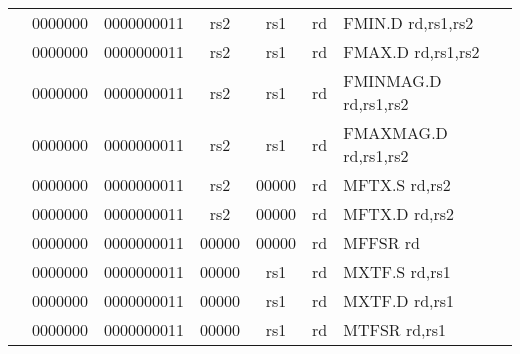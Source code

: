 \begin{table}[p]
\begin{small}
\begin{center}
\begin{tabular}{rcccccccccl}
&
\multicolumn{1}{|c|}{0000000} &
\multicolumn{5}{c|}{0000000011} &
\multicolumn{1}{c|}{rs2} &
\multicolumn{1}{c|}{rs1} &
\multicolumn{1}{c|}{rd} & FMIN.D rd,rs1,rs2 \\
\cline{2-10}
  

&
\multicolumn{1}{|c|}{0000000} &
\multicolumn{5}{c|}{0000000011} &
\multicolumn{1}{c|}{rs2} &
\multicolumn{1}{c|}{rs1} &
\multicolumn{1}{c|}{rd} & FMAX.D rd,rs1,rs2 \\
\cline{2-10}
  

&
\multicolumn{1}{|c|}{0000000} &
\multicolumn{5}{c|}{0000000011} &
\multicolumn{1}{c|}{rs2} &
\multicolumn{1}{c|}{rs1} &
\multicolumn{1}{c|}{rd} & FMINMAG.D rd,rs1,rs2 \\
\cline{2-10}
  

&
\multicolumn{1}{|c|}{0000000} &
\multicolumn{5}{c|}{0000000011} &
\multicolumn{1}{c|}{rs2} &
\multicolumn{1}{c|}{rs1} &
\multicolumn{1}{c|}{rd} & FMAXMAG.D rd,rs1,rs2 \\
\cline{2-10}
  

&
\multicolumn{1}{|c|}{0000000} &
\multicolumn{5}{c|}{0000000011} &
\multicolumn{1}{c|}{rs2} &
\multicolumn{1}{c|}{00000} &
\multicolumn{1}{c|}{rd} & MFTX.S rd,rs2 \\
\cline{2-10}
  

&
\multicolumn{1}{|c|}{0000000} &
\multicolumn{5}{c|}{0000000011} &
\multicolumn{1}{c|}{rs2} &
\multicolumn{1}{c|}{00000} &
\multicolumn{1}{c|}{rd} & MFTX.D rd,rs2 \\
\cline{2-10}
  

&
\multicolumn{1}{|c|}{0000000} &
\multicolumn{5}{c|}{0000000011} &
\multicolumn{1}{c|}{00000} &
\multicolumn{1}{c|}{00000} &
\multicolumn{1}{c|}{rd} & MFFSR rd \\
\cline{2-10}
  

&
\multicolumn{1}{|c|}{0000000} &
\multicolumn{5}{c|}{0000000011} &
\multicolumn{1}{c|}{00000} &
\multicolumn{1}{c|}{rs1} &
\multicolumn{1}{c|}{rd} & MXTF.S rd,rs1 \\
\cline{2-10}
  

&
\multicolumn{1}{|c|}{0000000} &
\multicolumn{5}{c|}{0000000011} &
\multicolumn{1}{c|}{00000} &
\multicolumn{1}{c|}{rs1} &
\multicolumn{1}{c|}{rd} & MXTF.D rd,rs1 \\
\cline{2-10}
  

&
\multicolumn{1}{|c|}{0000000} &
\multicolumn{5}{c|}{0000000011} &
\multicolumn{1}{c|}{00000} &
\multicolumn{1}{c|}{rs1} &
\multicolumn{1}{c|}{rd} & MTFSR rd,rs1 \\
\cline{2-10}
  


\end{tabular}
\end{center}
\end{small}
\end{table}
